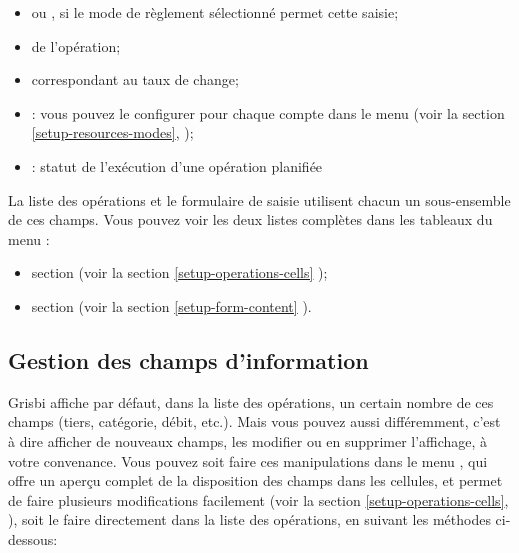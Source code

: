 \begin{itemize}
	\item {} ou , si le mode de règlement sélectionné permet cette saisie;
	\item {} de l'opération;
	\item {} correspondant au taux de change;
	\item {}: vous pouvez le configurer pour chaque compte dans le menu  (voir la section \vref{setup-resources-modes}, );
	\item {}: statut de l'exécution d'une opération planifiée
\end{itemize}

La liste des opérations et le formulaire de saisie utilisent chacun un sous-ensemble de ces champs. Vous pouvez voir les deux listes complètes dans les tableaux du menu :
\begin{itemize}
	\item section  (voir la section \vref{setup-operations-cells} );
	\item section  (voir la section \vref{setup-form-content} ).
\end{itemize}


\subsection{Gestion des champs d'information\label{transactions-list-fields-manage}}

Grisbi affiche par défaut, dans la liste des opérations, un certain nombre de ces champs (tiers, catégorie, débit, etc.). Mais vous pouvez aussi  différemment, c'est à dire afficher de nouveaux champs, les modifier ou en supprimer l'affichage, à votre convenance.
Vous pouvez soit faire ces manipulations dans le menu , qui offre un aperçu complet de la disposition des champs dans les cellules, et permet de faire plusieurs modifications facilement (voir la section \vref{setup-operations-cells}, ), soit le faire directement dans la liste des opérations, en suivant les méthodes ci-dessous:


